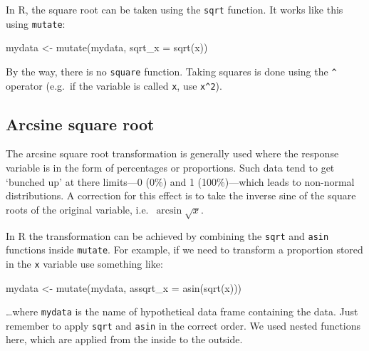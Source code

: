 \documentclass[
]{book}
\newenvironment{Shaded}{\begin{snugshade}}{\end{snugshade}}
\newcommand{\AttributeTok}[1]{\textcolor[rgb]{0.77,0.63,0.00}{#1}}
\newcommand{\FunctionTok}[1]{\textcolor[rgb]{0.00,0.00,0.00}{#1}}
\newcommand{\NormalTok}[1]{#1}
\newcommand{\OtherTok}[1]{\textcolor[rgb]{0.56,0.35,0.01}{#1}}
\begin{document}
In R, the square root can be taken using the \texttt{sqrt} function. It works like this using \texttt{mutate}:

\begin{Shaded}
\begin{Highlighting}[]
\NormalTok{mydata }\OtherTok{\textless{}{-}} \FunctionTok{mutate}\NormalTok{(mydata, }\AttributeTok{sqrt\_x =} \FunctionTok{sqrt}\NormalTok{(x))}
\end{Highlighting}
\end{Shaded}

By the way, there is no \texttt{square} function. Taking squares is done using the \texttt{\^{}} operator (e.g.~if the variable is called \texttt{x}, use \texttt{x\^{}2}).

\hypertarget{arcsine-square-root}{%
\subsection{Arcsine square root}\label{arcsine-square-root}}

The arcsine square root transformation is generally used where the response variable is in the form of percentages or proportions. Such data tend to get `bunched up' at there limits---0 (0\%) and 1 (100\%)---which leads to non-normal distributions. A correction for this effect is to take the inverse sine of the square roots of the original variable, i.e.~\(\arcsin \sqrt{x}\).

In R the transformation can be achieved by combining the \texttt{sqrt} and \texttt{asin} functions inside \texttt{mutate}. For example, if we need to transform a proportion stored in the \texttt{x} variable use something like:

\begin{Shaded}
\begin{Highlighting}[]
\NormalTok{mydata }\OtherTok{\textless{}{-}} \FunctionTok{mutate}\NormalTok{(mydata, }\AttributeTok{assqrt\_x =} \FunctionTok{asin}\NormalTok{(}\FunctionTok{sqrt}\NormalTok{(x)))}
\end{Highlighting}
\end{Shaded}

\ldots where \texttt{mydata} is the name of hypothetical data frame containing the data. Just remember to apply \texttt{sqrt} and \texttt{asin} in the correct order. We used nested functions here, which are applied from the inside to the outside.
\end{document}
